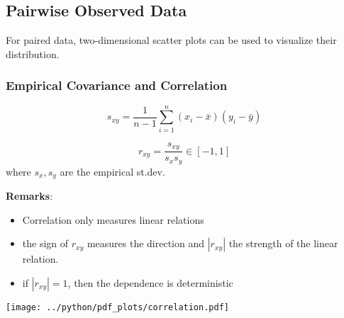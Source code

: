 \subsection{Pairwise Observed Data}
For paired data, two-dimensional scatter plots can be used to visualize their distribution.

\subsubsection{Empirical Covariance and Correlation}

\noindent\begin{equation*}
    s_{xy}=\frac{1}{n-1}\sum_{i=1}^n(x_i-\bar{x})(y_i-\bar{y})
\end{equation*}


\noindent\begin{equation*}
    r_{xy}=\frac{s_{xy}}{s_x s_y}\in[-1,1]
\end{equation*}
where $s_x,s_y$ are the empirical st.dev.\

\textbf{Remarks}:
\begin{itemize}
    \item Correlation only measures linear relations
    \item the sign of $r_{xy}$ measures the direction and $|r_{xy}|$ the strength of the linear relation.
    \item if $|r_{xy}|=1$, then the dependence is deterministic
\end{itemize}
\begin{center}
    \texttt{[image: ../python/pdf\_plots/correlation.pdf]}
\end{center}